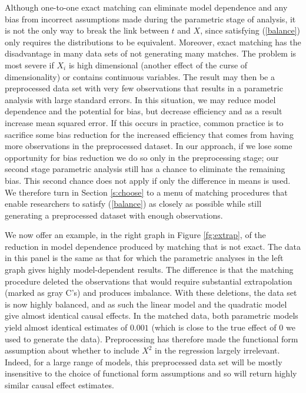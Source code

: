 \documentclass[11pt,titlepage]{article}
\begin{document}
Although one-to-one exact matching can eliminate model dependence and
any bias from incorrect assumptions made during the parametric stage
of analysis, it is not the only way to break the link between $t$ and
$X$, since satisfying (\ref{balance}) only requires the distributions
to be equivalent.  Moreover, exact matching has the disadvantage in
many data sets of not generating many matches.  The problem is most
severe if $X_i$ is high dimensional (another effect of the curse of
dimensionality) or contains continuous variables.  The result may then
be a preprocessed data set with very few observations that results in
a parametric analysis with large standard errors.  In this situation,
we may reduce model dependence and the potential for bias, but
decrease efficiency and as a result increase mean squared error.  If
this occurs in practice, common practice is to sacrifice some bias
reduction for the increased efficiency that comes from having more
observations in the preprocessed dataset.  In our approach, if we lose
some opportunity for bias reduction we do so only in the preprocessing
stage; our second stage parametric analysis still has a chance to
eliminate the remaining bias.  This second chance does not apply if
only the difference in means is used.  We therefore turn in Section
\ref{s:choose} to a menu of matching procedures that enable
researchers to satisfy (\ref{balance}) as closely as possible while
still generating a preprocessed dataset with enough observations.

We now offer an example, in the right graph in Figure \ref{fg:extrap},
of the reduction in model dependence produced by matching that is not
exact.  The data in this panel is the same as that for which the
parametric analyses in the left graph gives highly model-dependent
results.  The difference is that the matching procedure deleted the
observations that would require substantial extrapolation (marked as
gray C's) and produces imbalance.  With these deletions, the data set
is now highly balanced, and as such the linear model and the quadratic
model give almost identical causal effects.  In the matched data, both
parametric models yield almost identical estimates of $0.001$ (which
is close to the true effect of $0$ we used to generate the data).
Preprocessing has therefore made the functional form assumption about
whether to include $X^2$ in the regression largely irrelevant.
Indeed, for a large range of models, this preprocessed data set will
be mostly insensitive to the choice of functional form assumptions and
so will return highly similar causal effect estimates.
\end{document}
